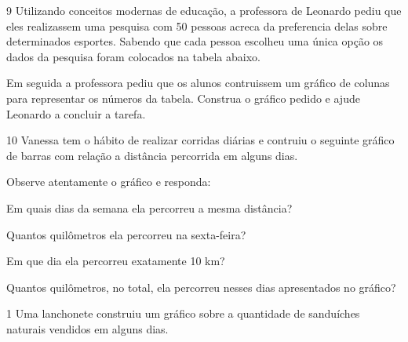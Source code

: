 \num{9} Utilizando conceitos modernas de educação, a professora de Leonardo
pediu que eles realizassem uma pesquisa com 50 pessoas acreca da
preferencia delas sobre determinados esportes. Sabendo que cada pessoa
escolheu uma única opção os dados da pesquisa foram colocados na tabela
abaixo.


Em seguida a professora pediu que os alunos contruissem um gráfico de
colunas para representar os números da tabela. Construa o gráfico pedido
e ajude Leonardo a concluir a tarefa.


\num{10} Vanessa tem o hábito de realizar corridas diárias e contruiu o
seguinte gráfico de barras com relação a distância percorrida em alguns
dias.


Observe atentamente o gráfico e responda:

\begin{escolha}
\item
  Em quais dias da semana ela percorreu a mesma distância?


\item
  Quantos quilômetros ela percorreu na sexta-feira?


\item
  Em que dia ela percorreu exatamente 10 km?


\item
  Quantos quilômetros, no total, ela percorreu nesses dias apresentados
  no gráfico?

\end{escolha}



\num{1} Uma lanchonete construiu um gráfico sobre a quantidade de
sanduíches naturais vendidos em alguns dias.

